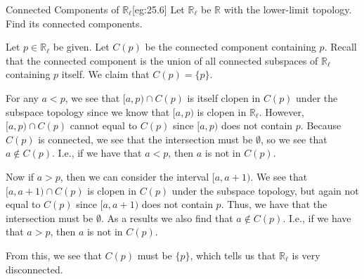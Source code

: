\begin{egBox}{Connected Components of \( \mathbb{R}_{ \ell } \)}[eg:25.6]
    Let \( \mathbb{R}_{ \ell } \) be \( \mathbb{R} \) with the lower-limit
    topology.
    Find its connected components.

    \baseSkip

    Let \( p \in \mathbb{R}_{ \ell } \) be given.
    Let \( C ( p ) \) be the connected component containing \( p \).
    Recall that the connected component is the union of all connected subspaces
    of \( \mathbb{R}_{ \ell } \) containing \( p \) itself.
    We claim that \( C ( p ) = \{ p \} \).

    \baseSkip

    For any \( a < p \), we see that \( [ a, p ) \cap C ( p ) \) is itself
    clopen in \( C ( p ) \) under the subspace topology since we know that
    \( [ a, p ) \) is clopen in \( \mathbb{R}_{ \ell } \).
    However, \( [ a, p ) \cap C ( p ) \) cannot equal to \( C ( p ) \) since
    \( [ a, p ) \) does not contain \( p \).
    Because \( C ( p ) \) is connected, we see that the intersection must be 
    \( \emptyset \), so we see that \( a \notin C ( p ) \).
    I.e., if we have that \( a < p \), then \( a \) is not in \( C ( p ) \).

    \baseSkip

    Now if \( a > p \), then we can consider the interval \( [ a, a + 1 ) \).
    We see that \( [ a, a +1 ) \cap C ( p ) \) is clopen in \( C ( p ) \)
    under the subspace topology, but again not equal to \( C ( p ) \) since
    \( [ a, a + 1 ) \) does not contain \( p \).
    Thus, we have that the intersection must be \( \emptyset \).
    As a results we also find that \( a \notin C ( p ) \). 
    I.e., if we have that \( a > p \), then \( a \) is not in \( C ( p ) \).
    
    \baseSkip 

    From this, we see that \( C ( p ) \) must be \( \{ p \} \), which tells us
    that \( \mathbb{R}_{ \ell } \) is very disconnected.
\end{egBox}